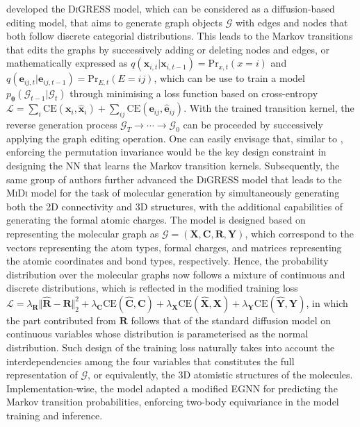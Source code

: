 \citet{vignac2022digress} developed the \textsc{DiGRESS} model, which can be considered as a diffusion-based editing model, that aims to generate graph objects $\mathcal{G}$ with edges and nodes that both follow discrete categorial distributions. This leads to the Markov transitions that  edits the graphs by successively adding or deleting nodes and edges, or mathematically expressed as $q(\bm{x}_{i,t}|\bm{x}_{i,t-1})=\mbox{Pr}_{x,t}(x=i)$ and $q(\bm{e}_{ij,t}|\bm{e}_{ij,t-1})=\mbox{Pr}_{E,t}(E=ij)$, which can be use to train a model $p_{\boldsymbol{\theta}}(\mathcal{G}_{t-1}|\mathcal{G}_t)$ through minimising a loss function based on cross-entropy $\mathcal{L}=\sum_i\mbox{CE}(\bm{x}_i,\hat{\bm{x}}_{i})+\sum_{ij}\mbox{CE}(\bm{e}_{ij},\hat{\bm{e}}_{ij})$. 
With the trained transition kernel, the reverse generation  process $\mathcal{G}_T\to\cdots\to\mathcal{G}_0$ can be proceeded by successively applying the graph editing operation. One can easily envisage that, similar to \citet{niu2020permutation}, enforcing the permutation invariance would be the key design constraint in designing the NN that learns the Markov transition kernels. Subsequently, the same group of authors\cite{vignac2023midi} further advanced the \textsc{DiGRESS} model that leads to the \textsc{MiDi} model for the task of molecular generation by simultaneously generating both the 2D connectivity and 3D structures, with the additional capabilities of generating the formal atomic charges. The model is designed based on representing the molecular graph as $\mathcal{G}=(\bm{X},\bm{C},\bm{R},\bm{Y})$, which correspond to the vectors representing the atom types, formal charges, and matrices representing the atomic coordinates and bond types, respectively. Hence, the probability distribution over the molecular graphs now follows a mixture of continuous and discrete distributions, which is reflected in the modified training loss $\mathcal{L}=\lambda_{\bm{R}}\Vert \hat{\bm{R}}-\bm{R}\Vert_2^2 +\lambda_{\bm{C}}\mbox{CE}(\hat{\bm{C}},\bm{C})+\lambda_{\bm{X}}\mbox{CE}(\hat{\bm{X}},\bm{X})+\lambda_{\bm{Y}}\mbox{CE}(\hat{\bm{Y}},\bm{Y})$, in which the part contributed from $\bm{R}$ follows that of the standard diffusion model on continuous variables whose distribution is parameterised as the normal distribution.\cite{ho2020denoising} Such design of the training loss naturally takes into account the interdependencies among the four variables that constitutes the full representation of $\mathcal{G}$, or equivalently, the 3D atomistic structures of the molecules. Implementation-wise, the model adapted a modified EGNN\cite{satorras2021n} for predicting the Markov transition probabilities, enforcing two-body equivariance in the model training and inference.
 
